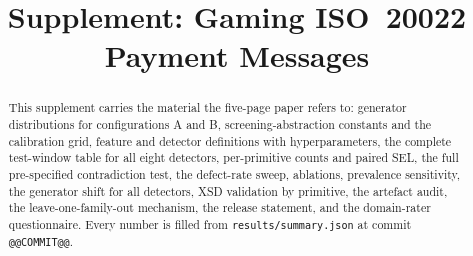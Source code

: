 \documentclass[conference]{IEEEtran}
\newif\ifanonymous
\begin{document}
\title{Supplement: Gaming ISO~20022 Payment Messages}
\ifanonymous
\author{\IEEEauthorblockN{Author names withheld for double-blind review}}
\else
\author{}
\fi
\maketitle
\begin{abstract}
This supplement carries the material the five-page paper refers to: generator
distributions for configurations A and B, screening-abstraction constants and
the calibration grid, feature and detector definitions with hyperparameters,
the complete test-window table for all eight detectors, per-primitive
counts and paired SEL, the full pre-specified contradiction test, the
defect-rate sweep, ablations, prevalence sensitivity, the generator shift for
all detectors, XSD validation by primitive, the artefact audit, the
leave-one-family-out mechanism, the release statement, and the domain-rater
questionnaire. Every number is filled from \texttt{results/summary.json} at
commit \texttt{@@COMMIT@@}.
\end{abstract}
\end{document}
